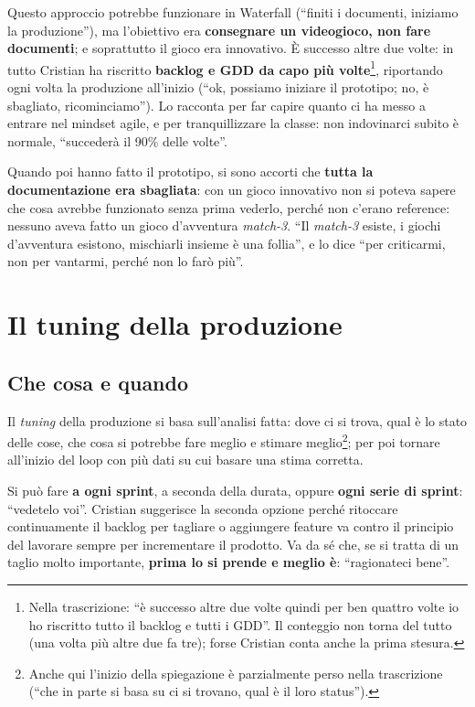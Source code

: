 Questo approccio potrebbe funzionare in Waterfall (``finiti i documenti,
iniziamo la produzione''), ma l'obiettivo era \textbf{consegnare un videogioco,
non fare documenti}; e soprattutto il gioco era innovativo. È successo altre due
volte: in tutto Cristian ha riscritto \textbf{backlog e GDD da capo più
volte}\footnote{Nella trascrizione: ``è successo altre due volte quindi per ben
quattro volte io ho riscritto tutto il backlog e tutti i GDD''. Il conteggio non
torna del tutto (una volta più altre due fa tre); forse Cristian conta anche la
prima stesura.}, riportando ogni volta la produzione all'inizio (``ok, possiamo
iniziare il prototipo; no, è sbagliato, ricominciamo''). Lo racconta per far
capire quanto ci ha messo a entrare nel mindset agile, e per tranquillizzare la
classe: non indovinarci subito è normale, ``succederà il 90\% delle volte''.

Quando poi hanno fatto il prototipo, si sono accorti che \textbf{tutta la
documentazione era sbagliata}: con un gioco innovativo non si poteva sapere che
cosa avrebbe funzionato senza prima vederlo, perché non c'erano reference:
nessuno aveva fatto un gioco d'avventura \emph{match-3}. ``Il \emph{match-3}
esiste, i giochi d'avventura esistono, mischiarli insieme è una follia'', e lo
dice ``per criticarmi, non per vantarmi, perché non lo farò più''.

\section{Il tuning della produzione}
\label{sec:z3-tuning}

\subsection{Che cosa e quando}

Il \emph{tuning} della produzione si basa sull'analisi fatta: dove ci si trova,
qual è lo stato delle cose, che cosa si potrebbe fare meglio e stimare
meglio\footnote{Anche qui l'inizio della spiegazione è parzialmente perso nella
trascrizione (``che in parte si basa su ci si trovano, qual è il loro
status'').}; per poi tornare all'inizio del loop con più dati su cui basare una
stima corretta.

Si può fare \textbf{a ogni sprint}, a seconda della durata, oppure \textbf{ogni
serie di sprint}: ``vedetelo voi''. Cristian suggerisce la seconda opzione
perché ritoccare continuamente il backlog per tagliare o aggiungere feature va
contro il principio del lavorare sempre per incrementare il prodotto. Va da sé
che, se si tratta di un taglio molto importante, \textbf{prima lo si prende e
meglio è}: ``ragionateci bene''.

